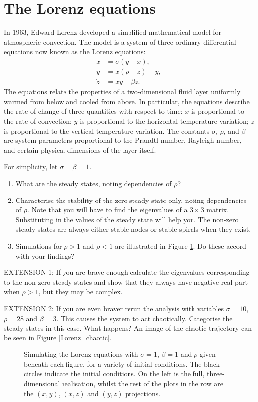 \documentclass[]{article}
\newcommand{\fig}[1]{Figure \ref{#1}}
\newcommand{\tp}{\textwidth}
\begin{document}
\section{The Lorenz equations}
In 1963, Edward Lorenz developed a simplified mathematical model for atmospheric convection. The model is a system of three ordinary differential equations now known as the Lorenz equations:
\begin{align}
\dot{x}&=\sigma (y-x),\\
\dot{y}&=x(\rho -z)-y,\\
\dot{z}&=xy-\beta z.
\end{align}
The equations relate the properties of a two-dimensional fluid layer uniformly warmed from below and cooled from above. In particular, the equations describe the rate of change of three quantities with respect to time: $x$ is proportional to the rate of convection; $y$ is proportional to the horizontal temperature variation; $z$ is proportional to the vertical temperature variation. The constants $\sigma$, $\rho$, and $\beta$ are system parameters proportional to the Prandtl number, Rayleigh number, and certain physical dimensions of the layer itself.

For simplicity, let $\sigma=\beta=1$.
\begin{enumerate}
\item What are the steady states, noting dependencies of $\rho$?
\item Characterise the stability of the  zero steady state only, noting dependencies of $\rho$. Note that you will have to find the eigenvalues of a $3\times 3$ matrix. Substituting in the values of the steady state will help you. The non-zero steady states are always either stable nodes or stable spirals when they exist.
\item Simulations for $\rho>1$ and $\rho<1$ are illustrated in \fig{Lorenz_stable}. Do these accord with your findings?
\end{enumerate}

EXTENSION 1: If you are brave enough calculate the eigenvalues corresponding to the non-zero steady states and show that they always have negative real part when $\rho>1$, but they may be complex.

EXTENSION 2: If you are even braver rerun the analysis with variables $\sigma=10$, $\rho=28$ and $\beta=3$. This causes the system to act chaotically. Categorise the steady states in this case. What happens? An image of the chaotic trajectory can be seen in \fig{Lorenz_chaotic}.
\begin{figure}[h!!!tb]
\centering
{}
\caption{\label{Lorenz_stable} Simulating the Lorenz equations with $\sigma=1$, $\beta=1$ and $\rho$ given beneath each figure, for a variety of initial conditions. The black circles indicate the initial conditions. On the left is the full, three-dimensional realisation, whilst the rest of the plots in the row are the $(x,y)$, $(x,z)$ and $(y,z)$ projections.}
\end{figure}
\end{document}
